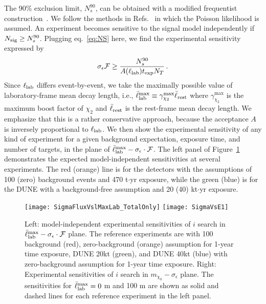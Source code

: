 The 90\%  exclusion limit, $N_s^{90}$, can be obtained with a modified frequentist construction~\cite{cls1,cls2}. We follow the methods in Refs.~\cite{Dermisek:2013cxa,Dermisek:2014qca,Dermisek:2016via} in which the Poisson likelihood is assumed. 
An experiment becomes sensitive to the signal model independently if $N_{\rm sig} \ge N_s^{90}$.
Plugging eq.~\eqref{eq:NS} here, we find the experimental sensitivity expressed by %
\begin{align}
\sigma_\epsilon \mathcal F \ge \frac{N_s^{90}}{A(\ell_{\rm lab}) t_{\rm exp} N_T}\,. 
\label{eq:MIsensitivity}
\end{align}
Since $\ell_{\rm lab}$ differs event-by-event, we take the maximally possible value of laboratory-frame mean decay length, i.e., $\bar{\ell}_{\rm lab}^{\rm max} \equiv \gamma_{\chi_2}^{\max} \bar{\ell}_{\rm rest}$ where $\gamma_{\chi_2}^{\max}$ is the maximum boost factor of $\chi_2$ and $\bar{\ell}_{\rm rest}$ is the rest-frame mean decay length. 
We emphasize that this is a rather conservative approach, because the acceptance $A$ is inversely proportional to $\ell_{\rm lab}$.
We then show the experimental sensitivity of any kind of experiment for a given background expectation, exposure time, and number of targets, in the plane of $\bar{\ell}_{\rm lab}^{\rm max} - \sigma_\epsilon \cdot \mathcal F$. 
The left panel of Figure~\ref{fig:modelindependent} demonstrates the expected model-independent sensitivities at several experiments. 
The red (orange) line is for the  detectors with the assumptions of 100 (zero) background events and 470 t$\cdot$yr exposure, while the green (blue) is for the DUNE  with a background-free assumption and 20 (40) kt$\cdot$yr exposure.

\begin{figure}[t]
\centering
\texttt{[image: SigmaFluxVslMaxLab\_TotalOnly]}
\texttt{[image: SigmaVsE1]}
\caption[Model-independent experimental sensitivities of $i$ search]{
Left: model-independent experimental sensitivities of $i$ search in $\bar{\ell}_{\rm lab}^{\rm max} - \sigma_\epsilon \cdot \mathcal F$ plane. 
The reference experiments are  with 100 background (red), zero-background (orange) assumption for 1-year time exposure, DUNE 20kt (green), and DUNE 40kt (blue) with zero-background assumption for 1-year time exposure. 
Right: Experimental sensitivities of $i$ search in $m_{\chi_0} - \sigma_\epsilon$ plane. The sensitivities for $\bar{\ell}_{\rm lab}^{\rm max} = 0$ m and 100 m are shown as solid and dashed lines for each reference experiment in the left panel.
\label{fig:modelindependent} }
\end{figure}

